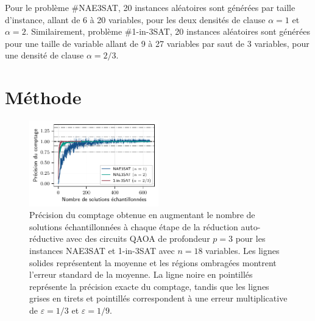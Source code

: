 Pour le problème \#NAE3SAT, 20 instances aléatoires sont générées par taille d'instance, allant de 6 à 20 variables, pour les deux densités de clause $\alpha=1$ et $\alpha = 2$. Similairement, problème \#1-in-3SAT, 20 instances aléatoires sont générées pour une taille de variable allant de 9 à 27 variables par saut de 3 variables, pour une densité de clause $\alpha = 2/3$. 


\section{Méthode}
\label{sec:methode}

\begin{figure}[H]
    \centering
    \includegraphics[width=0.50\textwidth]{figures/count-accuracy.pdf}
    \caption[Précision du comptage pour des problèmes \textsf{\#P}-difficile]{Précision du comptage obtenue en augmentant le nombre de solutions échantillonnées à chaque étape de la réduction auto-réductive avec des circuits QAOA de profondeur $p=3$ pour les instances NAE3SAT et 1-in-3SAT avec $n=18$ variables. Les lignes solides représentent la moyenne et les régions ombragées montrent l'erreur standard de la moyenne. La ligne noire en pointillés représente la précision exacte du comptage, tandis que les lignes grises en tirets et pointillés correspondent à une erreur multiplicative de $\varepsilon = 1/3$ et $\varepsilon = 1/9$.}
    \label{fig:count-accuracy.pdf}
\end{figure}

